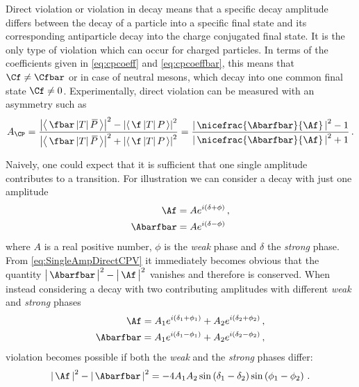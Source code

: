 Direct \CP violation or \CP violation in decay means that a specific decay amplitude differs between the decay of a particle into a specific final state and its corresponding antiparticle decay into the charge conjugated final state.
It is the only type of \CP violation which can occur for charged particles.
In terms of the \CP coefficients given in \cref{eq:cpcoeff} and \cref{eq:cpcoeffbar}, this means that $\Cf\neq\Cfbar$ or in case of neutral mesons, which decay into one common final state $\Cf\neq0$.
Experimentally, direct \CP violation can be measured with an asymmetry such as
\begin{equation}
A_{\CP}=\frac{\left|\left<\,\fbar\,|T|\,\kern 0.18em\overline{\kern -0.18em P}\,\right>\right|^2-\left|\left<\,\f\,|T|\,P\,\right>\right|^2}{\left|\left<\,\fbar\,|T|\,\kern 0.18em\overline{\kern -0.18em P}\,\right>\right|^2+\left|\left<\,\f\,|T|\,P\,\right>\right|^2} = \frac{\left|\,\nicefrac{\Abarfbar}{\Af}\,\right|^2-1}{\left|\,\nicefrac{\Abarfbar}{\Af}\,\right|^2+1}\,.
\end{equation}

Naively, one could expect that it is sufficient that one single amplitude contributes to a transition.
For illustration we can consider a decay with just one amplitude
\begin{equation}
\begin{split}
\Af&=Ae^{i\left(\delta+\phi\right)}\,,\\
\Abarfbar&=Ae^{i\left(\delta-\phi\right)}\label{eq:SingleAmpDirectCPV}
\end{split}
\end{equation}
where $A$ is a real positive number, $\phi$ is the \emph{weak} phase and $\delta$ the \emph{strong} phase.
From \cref{eq:SingleAmpDirectCPV} it immediately becomes obvious that the quantity $\big|\,\Abarfbar\,\big|^2-\big|\,\Af\,\big|^2$ vanishes and therefore \CP is conserved.
When instead considering a decay with two contributing amplitudes with different \emph{weak} and \emph{strong} phases
\begin{equation}
\begin{split}
\Af=A_1e^{i\left(\delta_1+\phi_1\right)}+A_2e^{i\left(\delta_2+\phi_2\right)}\,,\\
\Abarfbar=A_1e^{i\left(\delta_1-\phi_1\right)}+A_2e^{i\left(\delta_2-\phi_2\right)}\,,
\end{split}
\end{equation}
\CP violation becomes possible if both the \emph{weak} and the \emph{strong} phases differ:
\begin{equation}
\left|\,\Af\,\right|^2-\left|\,\Abarfbar\,\right|^2=-4A_1A_2\sin\left(\delta_1-\delta_2\right)\sin\left(\phi_1-\phi_2\right)\,.
\end{equation}

